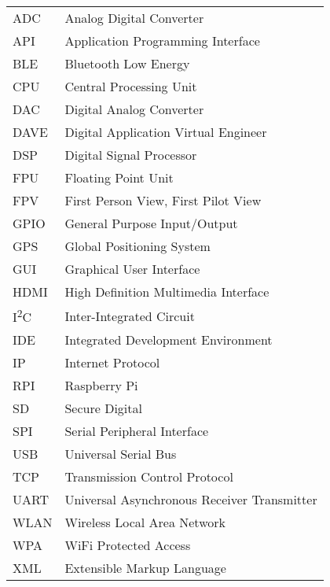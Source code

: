 \begin{singlespace}
\begin{flushleft}
\begin{longtable}{p{2 cm}p{14 cm}}
  ADC & Analog Digital Converter \\
  API & Application Programming Interface \\
  BLE & Bluetooth Low Energy \\
  CPU & Central Processing Unit \\
  DAC & Digital Analog Converter \\
  DAVE & Digital Application Virtual Engineer \\
  DSP & Digital Signal Processor \\
  FPU & Floating Point Unit \\
  FPV & First Person View, First Pilot View \\
  GPIO & General Purpose Input/Output \\
  GPS & Global Positioning System \\
  GUI & Graphical User Interface \\	
  HDMI & High Definition Multimedia Interface \\
  I\textsuperscript{2}C & Inter-Integrated Circuit \\
  IDE & Integrated Development Environment \\
  IP & Internet Protocol \\
  RPI & Raspberry Pi \\
  SD & Secure Digital \\
  SPI & Serial Peripheral Interface \\
  USB & Universal Serial Bus \\
  TCP & Transmission Control Protocol \\
  UART & Universal Asynchronous Receiver Transmitter \\
  WLAN & Wireless Local Area Network \\
  WPA & WiFi Protected Access \\
  XML & Extensible Markup Language \\
\end{longtable}
\end{flushleft}
\end{singlespace}
